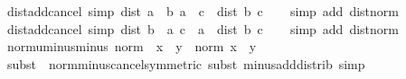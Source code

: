 \begin{isabellebody}
\isamarkupfalse%
%
\endisatagproof
{\isafoldproof}%
%
\isadelimproof
\isanewline
%
\endisadelimproof
\isanewline
{}\isamarkupfalse%
\ dist{\isacharunderscore}{\kern0pt}add{\isacharunderscore}{\kern0pt}cancel\ {\isacharbrackleft}{\kern0pt}simp{\isacharbrackright}{\kern0pt}{\isacharcolon}{\kern0pt}\ {\isachardoublequoteopen}dist\ {\isacharparenleft}{\kern0pt}a\ {\isacharplus}{\kern0pt}\ b{\isacharparenright}{\kern0pt}\ {\isacharparenleft}{\kern0pt}a\ {\isacharplus}{\kern0pt}\ c{\isacharparenright}{\kern0pt}\ {\isacharequal}{\kern0pt}\ dist\ b\ c{\isachardoublequoteclose}\isanewline
%
\isadelimproof
\ \ %
\endisadelimproof
%
\isatagproof
{}\isamarkupfalse%
\ {\isacharparenleft}{\kern0pt}simp\ add{\isacharcolon}{\kern0pt}\ dist{\isacharunderscore}{\kern0pt}norm{\isacharparenright}{\kern0pt}%
\endisatagproof
{\isafoldproof}%
%
\isadelimproof
\isanewline
%
\endisadelimproof
\isanewline
{}\isamarkupfalse%
\ dist{\isacharunderscore}{\kern0pt}add{\isacharunderscore}{\kern0pt}cancel{}\ {\isacharbrackleft}{\kern0pt}simp{\isacharbrackright}{\kern0pt}{\isacharcolon}{\kern0pt}\ {\isachardoublequoteopen}dist\ {\isacharparenleft}{\kern0pt}b\ {\isacharplus}{\kern0pt}\ a{\isacharparenright}{\kern0pt}\ {\isacharparenleft}{\kern0pt}c\ {\isacharplus}{\kern0pt}\ a{\isacharparenright}{\kern0pt}\ {\isacharequal}{\kern0pt}\ dist\ b\ c{\isachardoublequoteclose}\isanewline
%
\isadelimproof
\ \ %
\endisadelimproof
%
\isatagproof
{}\isamarkupfalse%
\ {\isacharparenleft}{\kern0pt}simp\ add{\isacharcolon}{\kern0pt}\ dist{\isacharunderscore}{\kern0pt}norm{\isacharparenright}{\kern0pt}%
\endisatagproof
{\isafoldproof}%
%
\isadelimproof
\isanewline
%
\endisadelimproof
\isanewline
{}\isamarkupfalse%
\ norm{\isacharunderscore}{\kern0pt}uminus{\isacharunderscore}{\kern0pt}minus{\isacharcolon}{\kern0pt}\ {\isachardoublequoteopen}norm\ {\isacharparenleft}{\kern0pt}{\isacharminus}{\kern0pt}\ x\ {\isacharminus}{\kern0pt}\ y{\isacharparenright}{\kern0pt}\ {\isacharequal}{\kern0pt}\ norm\ {\isacharparenleft}{\kern0pt}x\ {\isacharplus}{\kern0pt}\ y{\isacharparenright}{\kern0pt}{\isachardoublequoteclose}\isanewline
%
\isadelimproof
\ \ %
\endisadelimproof
%
\isatagproof
{}\isamarkupfalse%
\ {\isacharparenleft}{\kern0pt}subst\ {\isacharparenleft}{\kern0pt}{}{\isacharparenright}{\kern0pt}\ norm{\isacharunderscore}{\kern0pt}minus{\isacharunderscore}{\kern0pt}cancel{\isacharbrackleft}{\kern0pt}symmetric{\isacharbrackright}{\kern0pt}{\isacharcomma}{\kern0pt}\ subst\ minus{\isacharunderscore}{\kern0pt}add{\isacharunderscore}{\kern0pt}distrib{\isacharparenright}{\kern0pt}\ simp%

\end{isabellebody}
